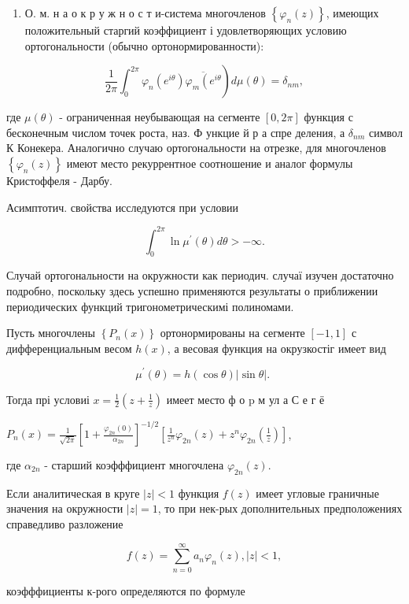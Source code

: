 \documentclass[10pt]{article}
\begin{document}
\begin{enumerate}
  \item О. м. н а о к р у ж н о с т и-система многочленов $\left\{\varphi_{n}(z)\right\}$, имеющих положительный старгий коэффициент і удовлетворяющих условию ортогональности (обычно ортонормированности):
\end{enumerate}

\[
\left.\frac{1}{2 \pi} \int_{0}^{2 \pi} \varphi_{n}\left(e^{i \theta}\right) \overline{\varphi_{m}\left(e^{i \theta}\right.}\right) d \mu(\theta)=\delta_{n m},
\]

где $\mu(\theta)$ - ограниченная неубывающая на сегменте $[0,2 \pi]$ функция с бесконечным числом точек роста, наз. Ф ункцие й р а спре деления, а $\delta_{n m}$ символ К Конекера. Аналогично случаю ортогональности на отрезке, для многочленов $\left\{\varphi_{n}(z)\right\}$ имеют место рекуррентное соотношение и аналог формулы Кристоффеля - Дарбу.

Асимптотич. свойства исследуются при условии

\[
\int_{0}^{2 \pi} \ln \mu^{\prime}(\theta) d \theta>-\infty .
\]

Случай ортогональности на окружности как периодич. случаї изучен достаточно подробно, поскольку здесь успешно применяются результаты о приближении периодических функций тригонометрическимі полиномами.

Пусть многочлены $\left\{P_{n}(x)\right\}$ ортонормированы на сегменте $[-1,1]$ с дифференциальным весом $h(x)$, а весовая функция на окрузкостіг имеет вид

\[
\mu^{\prime}(\theta)=h(\cos \theta)|\sin \theta| \text {. }
\]

Тогда прі условиі $x=\frac{1}{2}\left(z+\frac{1}{z}\right)$ имеет место ф о $\mathrm{p}$ м ул а С е г ё

$P_{n}(x)=\frac{1}{\sqrt{2 \pi}}\left[1+\frac{\varphi_{2 n}(0)}{\alpha_{2 n}}\right]^{-1 / 2}\left[\frac{1}{z^{n}} \varphi_{2 n}(z)+z^{n} \varphi_{2 n}\left(\frac{1}{z}\right)\right]$,

где $\alpha_{2 n}$ - старший коэфффициент многочлена $\varphi_{2 n}(z)$.

Если аналитическая в круге $|z|<1$ функция $f(z)$ имеет угловые граничные значения на окружности $|z|=1$, то при нек-рых дополнительных предположениях справедливо разложение

\[
f(z)=\sum_{n=0}^{\infty} a_{n} \varphi_{n}(z),|z|<1,
\]

коэфффициенты к-рого определяются по формуле
\end{document}
